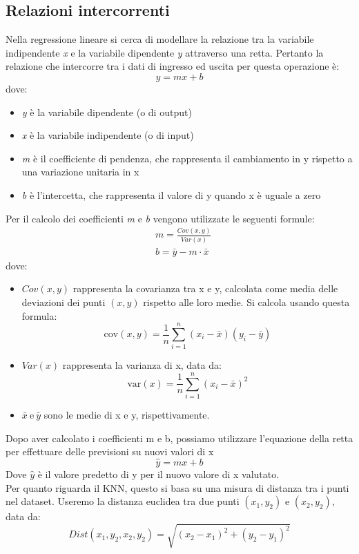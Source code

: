 \documentclass[11pt]{article}
\theoremstyle{definition}
\begin{document}
\subsection{Relazioni intercorrenti}
Nella regressione lineare si cerca di modellare la relazione tra la variabile indipendente \textit{x} e la variabile dipendente \textit{y} attraverso una retta. Pertanto la relazione che intercorre tra i dati di ingresso ed uscita per questa operazione è:
$$
y=mx+b
$$
dove:
\begin{itemize}
\item \textit{y} è la variabile dipendente (o di output)
\item \textit{x} è la variabile indipendente (o di input)
\item \textit{m} è il coefficiente di pendenza, che rappresenta il cambiamento in y rispetto a una variazione unitaria in x
\item \textit{b} è l'intercetta, che rappresenta il valore di y quando x è uguale a zero
\end{itemize}
Per il calcolo dei coefficienti \textit{m} e \textit{b} vengono utilizzate le seguenti formule:
\begin{align*}
&m = \frac{Cov(x,y)}{Var(x)}\\
&b=\bar{y}-m\cdot \bar{x}
\end{align*}
dove:
\begin{itemize}
\item $Cov(x,y)$ rappresenta la covarianza tra x e y, calcolata come media delle deviazioni dei punti $(x,y)$ rispetto alle loro medie. Si calcola usando questa formula:
$$
\text{cov}(x, y) = \frac{1}{n} \sum_{i=1}^{n} (x_i - \bar{x})(y_i - \bar{y})
$$
\item $Var(x)$ rappresenta la varianza di x, data da:
$$
\text{var}(x) = \frac{1}{n} \sum_{i=1}^{n} (x_i - \bar{x})^2
$$
\item $\bar{x} \ \text{e} \ \bar{y}$ sono le medie di x e y, rispettivamente.
\end{itemize}
Dopo aver calcolato i coefficienti m e b, possiamo utilizzare l'equazione della retta per effettuare delle previsioni su nuovi valori di x
$$
\hat{y} = mx+b
$$
Dove $\hat{y}$ è il valore predetto di y per il nuovo valore di x valutato.  \\
\newline
Per quanto riguarda il KNN, questo si basa su una misura di distanza tra i punti nel dataset. Useremo la distanza euclidea tra due punti $(x_1,y_2)$ e $(x_2,y_2)$, data da:
$$
Dist(x_1,y_2,x_2,y_2)=\sqrt{(x_2-x_1)^2 + (y_2-y_1)^2}
$$ 
\end{document}
